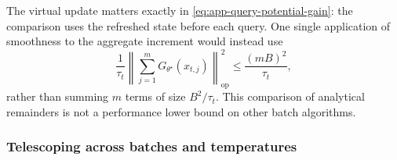 \documentclass[10pt,twoside,letterpaper]{article}
\newcommand{\op}{\mathrm{op}}
\begin{document}
The virtual update matters exactly in
\eqref{eq:app-query-potential-gain}: the comparison uses the refreshed
state before each query. One single application of smoothness to the
aggregate increment would instead use
\begin{equation}
\frac1{\tau_t}\left\|\sum_{j=1}^mG_{\theta^\star}(x_{t,j})\right\|_{\op}^2
\le\frac{(mB)^2}{\tau_t},
\label{eq:app-coarse-batch-remainder}
\end{equation}
rather than summing $m$ terms of size $B^2/\tau_t$.
This comparison of analytical remainders is not a performance lower
bound on other batch algorithms.

\subsubsection{Telescoping across batches and temperatures}
\end{document}
